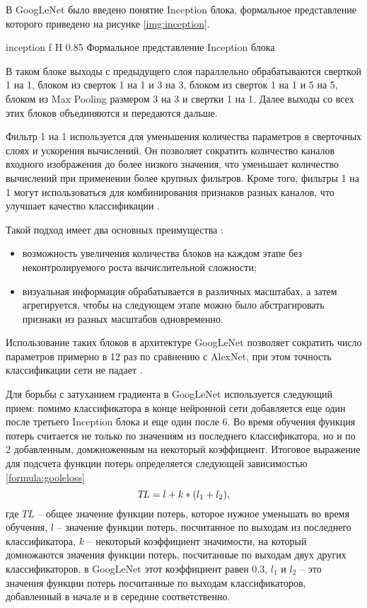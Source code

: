 В GoogLeNet было введено понятие Inception блока, формальное представление которого приведено на рисунке \ref{img:inception}.

{inception} %
{f} %
{H} %
{0.85\textwidth} %
{Формальное представление Inception блока} %

В таком блоке выходы с предыдущего слоя параллельно обрабатываются сверткой 1 на 1, блоком из сверток 1 на 1 и 3 на 3, блоком из сверток 1 на 1 и 5 на 5, блоком из Max Pooling размером 3 на 3 и свертки 1 на 1. Далее выходы со всех этих блоков объединяются и передаются дальше.

Фильтр 1 на 1 используется для уменьшения количества параметров в сверточных слоях и ускорения вычислений. Он позволяет сократить количество каналов входного изображения до более низкого значения, что уменьшает количество вычислений при применении более крупных фильтров. Кроме того, фильтры 1 на 1 могут использоваться для комбинирования признаков разных каналов, что улучшает качество классификации \cite{googlenet}.

Такой подход имеет два основных преимущества \cite{googlenet}:
\begin{itemize}
	\item возможность увеличения количества блоков на каждом этапе без неконтролируемого роста вычислительной сложности;
	\item визуальная информация обрабатывается в различных масштабах, а затем агрегируется, чтобы на следующем этапе можно было абстрагировать признаки из разных масштабов одновременно.
\end{itemize}

Использование таких блоков в архитектуре GoogLeNet позволяет сократить число параметров примерно в 12 раз по сравнению с AlexNet, при этом точность классификации сети не падает \cite{googlenet}.

Для борьбы с затуханием градиента в GoogLeNet используется следующий прием: помимо классификатора в конце нейронной сети добавляется еще один после третьего Inception блока и еще один после 6. Во время обучения функция потерь считается не только по значениям из последнего классификатора, но и по 2 добавленным, домжноженным на некоторый коэффициент. Итоговое выражение для подсчета функции потерь определяется следующей зависимостью \ref{formula:gooleloss}
\begin{equation}\label{formula:gooleloss}
T\!L = l + k * (l_{\rm{1}} + l_{\rm{2}}),
\end{equation}
где $T\!L$ -- общее значение функции потерь, которое нужное уменьшать во время обучения, $l$ -- значение функции потерь, посчитанное по выходам из последнего классификатора, $k$ -- некоторый коэффициент значимости, на который домножаются значения функции потерь, посчитанные по выходам двух других классификаторов, в GoogLeNet этот коэффициент равен 0.3, $l_1$ и $l_2$ -- это значения функции потерь посчитанные по выходам классификаторов, добавленный в начале и в середине соответственно.

